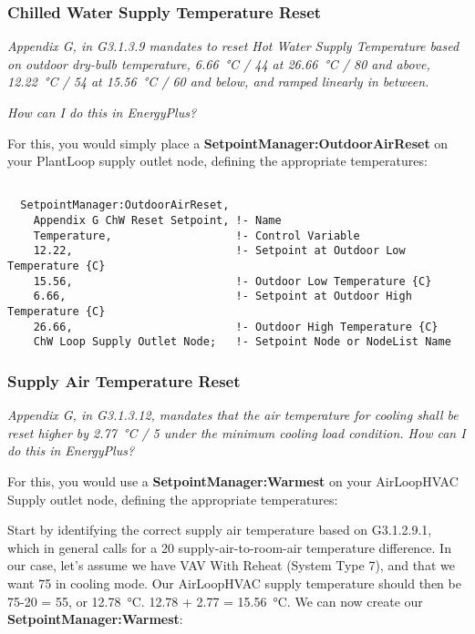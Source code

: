 \subsubsection{Chilled Water Supply Temperature Reset}%
\label{ssub:chilled_water_supply_temperature_reset}

\emph{Appendix G, in G3.1.3.9 mandates to reset Hot Water Supply Temperature based on outdoor dry-bulb temperature, \SI{6.66}{\celsius} / \SI{44}{\farenheit} at \SI{26.66}{\celsius}  / \SI{80}{\farenheit}  and above, \SI{12.22}{\celsius} / \SI{54}{\farenheit} at \SI{15.56}{\celsius} / \SI{60}{\farenheit} and below, and ramped linearly in between.}

\emph{How can I do this in EnergyPlus?}

For this, you would simply place a \textbf{SetpointManager:OutdoorAirReset} on your PlantLoop supply outlet node, defining the appropriate temperatures:

\begin{lstlisting}

  SetpointManager:OutdoorAirReset,
    Appendix G ChW Reset Setpoint, !- Name
    Temperature,                   !- Control Variable
    12.22,                         !- Setpoint at Outdoor Low Temperature {C}
    15.56,                         !- Outdoor Low Temperature {C}
    6.66,                          !- Setpoint at Outdoor High Temperature {C}
    26.66,                         !- Outdoor High Temperature {C}
    ChW Loop Supply Outlet Node;   !- Setpoint Node or NodeList Name

\end{lstlisting}




\subsubsection{Supply Air Temperature Reset}%
\label{ssub:supply_air_temperature_reset}

\emph{Appendix G, in G3.1.3.12, mandates that the air temperature for cooling shall be reset higher by \SI{2.77}{\celsius} / \SI{5}{\farenheit} under the minimum cooling load condition. How can I do this in EnergyPlus?}

For this, you would use a \textbf{SetpointManager:Warmest} on your AirLoopHVAC Supply outlet node, defining the appropriate temperatures:

Start by identifying the correct supply air temperature based on G3.1.2.9.1, which in general calls for a \SI{20}{\farenheit} supply-air-to-room-air temperature difference.
In our case, let's assume we have VAV With Reheat (System Type 7), and that we want \SI{75}{\farenheit} in cooling mode. Our AirLoopHVAC supply temperature should then be 75-20 = \SI{55}{\farenheit}, or \SI{12.78}{\celsius}. 12.78  + 2.77 = \SI{15.56}{\celsius}. We can now create our \textbf{SetpointManager:Warmest}:

